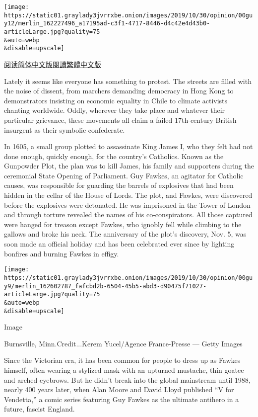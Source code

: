 \texttt{[image: https://static01.graylady3jvrrxbe.onion/images/2019/10/30/opinion/00guy12/merlin\_162227496\_a17195ad-c3f1-4717-8446-d4c42e4d43b0-articleLarge.jpg?quality=75\\\&auto=webp\\\&disable=upscale]}

\href{https://cn.nytimes3xbfgragh.onion/opinion/20191126/guy-fawkes-day-v-for-vendetta/}{阅读简体中文版}\href{https://cn.nytimes3xbfgragh.onion/opinion/20191126/guy-fawkes-day-v-for-vendetta/zh-hant/}{閱讀繁體中文版}

Lately it seems like everyone has something to protest. The streets are
filled with the noise of dissent, from marchers demanding democracy in
Hong Kong to demonstrators insisting on economic equality in Chile to
climate activists chanting worldwide. Oddly, wherever they take place
and whatever their particular grievance, these movements all claim a
failed 17th-century British insurgent as their symbolic confederate.

In 1605, a small group plotted to assassinate King James I, who they
felt had not done enough, quickly enough, for the country's Catholics.
Known as the Gunpowder Plot, the plan was to kill James, his family and
supporters during the ceremonial State Opening of Parliament. Guy
Fawkes, an agitator for Catholic causes, was responsible for guarding
the barrels of explosives that had been hidden in the cellar of the
House of Lords. The plot, and Fawkes, were discovered before the
explosives were detonated. He was imprisoned in the Tower of London and
through torture revealed the names of his co-conspirators. All those
captured were hanged for treason except Fawkes, who ignobly fell while
climbing to the gallows and broke his neck. The anniversary of the
plot's discovery, Nov. 5, was soon made an official holiday and has been
celebrated ever since by lighting bonfires and burning Fawkes in effigy.

\texttt{[image: https://static01.graylady3jvrrxbe.onion/images/2019/10/30/opinion/00guy9/merlin\_162602787\_fafcbd2b-6504-45b5-abd3-d90475f71027-articleLarge.jpg?quality=75\\\&auto=webp\\\&disable=upscale]}

Image

Burnsville, Minn.Credit...Kerem Yucel/Agence France-Presse --- Getty
Images

Since the Victorian era, it has been common for people to dress up as
Fawkes himself, often wearing a stylized mask with an upturned mustache,
thin goatee and arched eyebrows. But he didn't break into the global
mainstream until 1988, nearly 400 years later, when Alan Moore and David
Lloyd published ``V for Vendetta,'' a comic series featuring Guy Fawkes
as the ultimate antihero in a future, fascist England.

